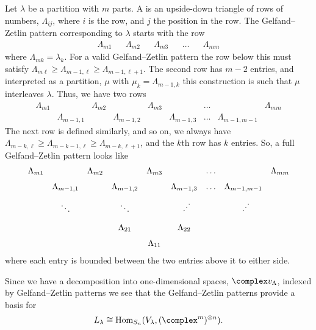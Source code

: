 Let \(\lambda\) be a partition with \(m\) parts.
A  is an upside-down triangle of rows of numbers, \(\Lambda_{ij}\), where \(i\) is the row, and \(j\) the position in the row.
The Gelfand--Zetlin pattern corresponding to \(\lambda\) starts with the row
\begin{equation}
    \begin{array}{ccccccccc}
        \Lambda_{m1} && \Lambda_{m2} && \Lambda_{m3} && \dotso && \Lambda_{mm}
    \end{array}
\end{equation}
where \(\Lambda_{mk} = \lambda_k\).
For a valid Gelfand--Zetlin pattern the row below this must satisfy \(\Lambda_{m\ell} \ge \Lambda_{m-1,\ell} \ge \Lambda_{m-1,\ell+1}\).
The second row has \(m - 2\) entries, and interpreted as a partition, \(\mu\) with \(\mu_k = \Lambda_{m-1,k}\) this construction is such that \(\mu\) interleaves \(\lambda\).
Thus, we have two rows
\begin{equation}
    \begin{array}{ccccccccc}
        \Lambda_{m1} && \Lambda_{m2} && \Lambda_{m3} && \dotso && \Lambda_{mm}\\[1.5ex]
        & \Lambda_{m-1,1} && \Lambda_{m-1,2} && \Lambda_{m-1,3} & \dotso & \Lambda_{m-1,m-1} &
    \end{array}
\end{equation}
The next row is defined similarly, and so on, we always have \(\Lambda_{m-k,\ell} \ge \Lambda_{m-k-1,\ell} \ge \Lambda_{m-k,\ell+1}\), and the \(k\)th row has \(k\) entries.
So, a full Gelfand--Zetlin pattern looks like 
\begin{equation}
    \begin{array}{ccccccccc}
        \Lambda_{m1} && \Lambda_{m2} && \Lambda_{m3} && \dotso && \Lambda_{mm}\\[1.5ex]
        & \Lambda_{m-1,1} && \Lambda_{m-1,2} && \Lambda_{m-1,3} & \dotso & \Lambda_{m-1,m-1} &\\[2ex]
        & \ddots && \ddots && \rotatebox{90}{\(\ddots\)} &  & \rotatebox{90}{\(\ddots\)} &\\[2ex]
        &&& \Lambda_{21} && \Lambda_{22} &&&\\[1.5ex]
        &&&& \Lambda_{11} &&&&
    \end{array}
\end{equation}
where each entry is bounded between the two entries above it to either side.

Since we have a decomposition into one-dimensional spaces, \(\complex v_\Lambda\), indexed by Gelfand--Zetlin patterns we see that the Gelfand--Zetlin patterns provide a basis for
\begin{equation}
    L_\lambda \isomorphic \Hom_{S_n}(V_\lambda, (\complex^m)^{\otimes n}).
\end{equation}

